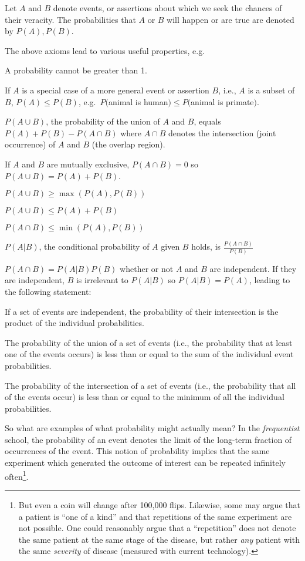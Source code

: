 Let $A$ and $B$ denote events, or assertions about which we seek the
chances of their veracity.  The probabilities that $A$ or $B$ will
happen or are true are denoted by $P(A), P(B)$.

The above axioms lead to various useful properties, e.g.
\be
\item A probability cannot be greater than 1.
\item If $A$ is a special case of a more general
  event or assertion $B$, i.e., $A$ is a subset of $B$, $P(A) \leq
  P(B)$, e.g.\ $P($animal is human$) \leq P($animal is primate$)$.
\item $P(A \cup B)$, the probability of the union of $A$ and $B$,
  equals $P(A) + P(B) - P(A \cap B)$ where $A \cap B$ denotes the
  intersection (joint occurrence) of $A$ and $B$ (the overlap region).
\item If $A$ and $B$ are mutually exclusive, $P(A \cap B) = 0$ so $P(A
  \cup B) = P(A) + P(B)$.
\item $P(A \cup B) \geq \max(P(A), P(B))$
\item $P(A \cup B) \leq P(A) + P(B)$
\item $P(A \cap B) \leq \min(P(A), P(B))$
\item $P(A | B)$, the conditional probability of $A$ given $B$ holds,
  is $\frac{P(A \cap B)}{P(B)}$
\item $P(A \cap B) = P(A | B) P(B)$ whether or not $A$ and $B$ are
  independent.  If they are independent, $B$ is irrelevant to $P(A |
  B)$ so $P(A | B) = P(A)$, leading to the following statement:
\item If a set of events are independent, the probability of their
  intersection is the product of the individual probabilities.
\item The probability of the union of a set of events (i.e., the
  probability that at least one of the events occurs) is less than or
  equal to the sum of the individual event probabilities.
\item The probability of the intersection of a set of events (i.e.,
  the probability that all of the events occur) is less than or
  equal to the minimum of all the individual probabilities.
\ee

So what are examples of what probability might actually mean?
In the \emph{frequentist} school, the probability of
an event denotes the limit of the long-term fraction of occurrences
of the event.  This notion of probability implies that the same
experiment which generated the outcome of interest can be repeated
infinitely often\footnote{But even a coin will change after 100,000 flips.
Likewise, some may argue that a patient is ``one of a kind'' and that
repetitions of the same experiment are not possible.  One could
reasonably argue that a ``repetition'' does not denote the same
patient at the same stage of the disease, but rather \emph{any} patient
with the same \emph{severity} of disease (measured with current
technology).}.

